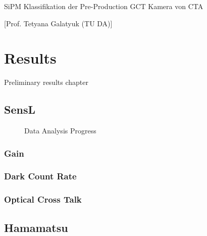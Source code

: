 \documentclass[article,type=msc,colorback,accentcolor=tud9c]{tudthesis}
\begin{document}
{SiPM Klassifikation der Pre-Production GCT Kamera von CTA}
\author{Ben Gebhardt}
[Prof. Tetyana Galatyuk (TU DA)]
\dateofexam{\today}{\today}
\makethesistitle
{}

\section{Results}
Preliminary results chapter

    \subsection{SensL}
    \begin{figure}[h]
    \begin{centering}
    
    \caption{Data Analysis Progress}
    \label{fig:removepeaks}
    \end{centering}
    \end{figure}
        \subsubsection{Gain}
        \subsubsection{Dark Count Rate}
        \subsubsection{Optical Cross Talk}

    \subsection{Hamamatsu}
\end{document}
